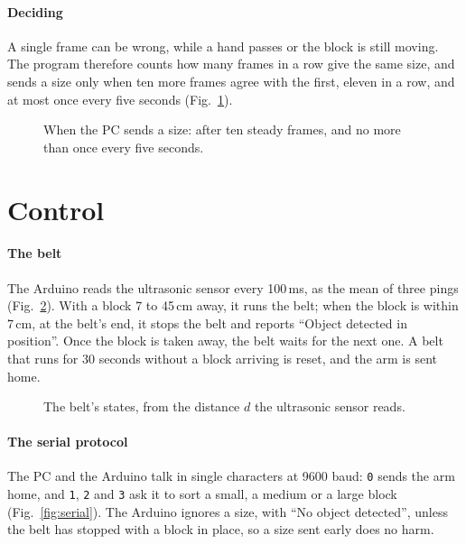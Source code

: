 \documentclass[11pt]{article}
\begin{document}
\paragraph{Deciding} A single frame can be wrong, while a hand passes or the block is still moving. The program therefore counts how many frames in a row give the same size, and sends a size only when ten more frames agree with the first, eleven in a row, and at most once every five seconds (Fig.~\ref{fig:decision}).

\begin{figure}[htbp]
  \centering
  \caption{When the PC sends a size: after ten steady frames, and no more than once every five seconds.}
  \label{fig:decision}
\end{figure}

\section{Control}
\label{sec:control}

\paragraph{The belt} The Arduino reads the ultrasonic sensor every 100\,ms, as the mean of three pings (Fig.~\ref{fig:belt}). With a block 7 to 45\,cm away, it runs the belt; when the block is within 7\,cm, at the belt's end, it stops the belt and reports ``Object detected in position''. Once the block is taken away, the belt waits for the next one. A belt that runs for 30 seconds without a block arriving is reset, and the arm is sent home.

\begin{figure}[htbp]
  \centering
  \caption{The belt's states, from the distance $d$ the ultrasonic sensor reads.}
  \label{fig:belt}
\end{figure}

\paragraph{The serial protocol} The PC and the Arduino talk in single characters at 9600 baud: \texttt{0} sends the arm home, and \texttt{1}, \texttt{2} and \texttt{3} ask it to sort a small, a medium or a large block (Fig.~\ref{fig:serial}). The Arduino ignores a size, with ``No object detected'', unless the belt has stopped with a block in place, so a size sent early does no harm.
\end{document}

